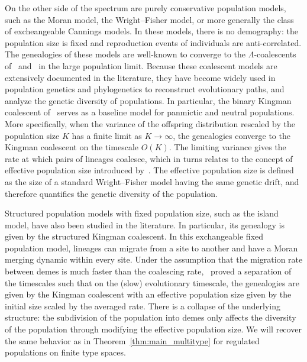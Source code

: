 \begin{refsegment}
On the other side of the spectrum are purely conservative population models, such as the Moran model, the Wright--Fisher model, or more generally the class of excheangeable Cannings models. In these models, there is no demography: the population size is fixed and reproduction events of individuals are anti-correlated. The genealogies of these models are well-known to converge to the $\Lambda$-coalescents of~\cite{Pitman:1999aa} and~\cite{sagitov1999general} in the large population limit. Because these coalescent models are extensively documented in the literature, they have become widely used in population genetics and phylogenetics to reconstruct evolutionary paths, and analyze the genetic diversity of populations. In particular, the binary Kingman coalescent of~\cite{Kingman:1982aa} serves as a baseline model for panmictic and neutral populations.
More specifically, when the variance of the offspring distribution rescaled by the population size $K$ has a finite limit as $K \to \infty$, the genealogies converge to the Kingman coalescent on the timescale $O(K)$.   The limiting variance gives the rate at which pairs of lineages coalesce, which in turns relates to the concept of effective population size introduced by~\cite{wright_evolution_1931}. The effective population size is defined as the size of a standard Wright--Fisher model having the same genetic drift, and therefore quantifies the genetic diversity of the population.

Structured population models with fixed population size, such as the island model, have also been studied in the literature. In particular, its genealogy is given by the structured Kingman coalescent. In this exchangeable fixed population model, lineages can migrate from a site to another and have a Moran merging dynamic within every site. Under the assumption that the migration rate between demes is much faster than the coalescing rate,~\cite{nordborg_separation_2002} proved a separation of the timescales such that on the (slow) evolutionary timescale, the genealogies are given by the Kingman coalescent with an effective population size given by the initial size scaled by the averaged rate. There is a collapse of the underlying structure: the subdivision of the population into demes only affects the diversity of the population through modifying the effective population size.
 We will recover the same behavior as in Theorem~\ref{thm:main_multitype} for regulated populations on finite type spaces.


\end{refsegment}
